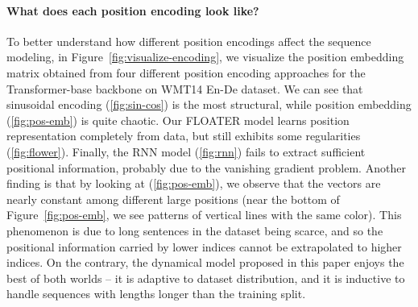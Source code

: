 \documentclass[11pt]{article}
\begin{document}
\paragraph{What does each position encoding look like? }
To better understand how different position encodings affect the sequence modeling, in Figure~\ref{fig:visualize-encoding}, we visualize the position embedding matrix  obtained from four different position encoding approaches for the Transformer-base backbone on WMT14 En-De dataset. We can see that sinusoidal encoding (\ref{fig:sin-cos}) is the most structural, while position embedding (\ref{fig:pos-emb}) is quite chaotic. Our FLOATER model learns position representation completely from data, but still exhibits some regularities (\ref{fig:flower}). Finally, the RNN model (\ref{fig:rnn}) fails to extract sufficient positional information, probably due to the vanishing gradient problem. Another finding is that by looking at (\ref{fig:pos-emb}), we observe that the vectors are nearly constant among different large positions (near the bottom of Figure~\ref{fig:pos-emb}, we see patterns of vertical lines with the same color). This phenomenon is due to long sentences in the dataset being scarce, and so the positional information carried by lower indices cannot be extrapolated to higher indices. On the contrary, the dynamical model proposed in this paper enjoys the best of both worlds -- it is adaptive to dataset distribution, and it is inductive to handle sequences with lengths longer than the training split.
\end{document}
